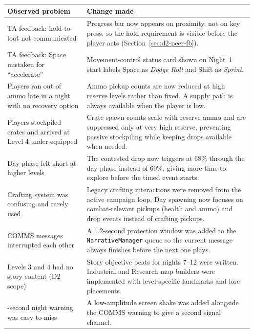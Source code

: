 \documentclass[11pt,a4paper]{article}
\begin{document}
\begin{tcolorbox}[tableframe]
\small
\begin{tabularx}{\textwidth}{@{} p{3.5cm} X @{}}
\toprule
\textbf{Observed problem} & \textbf{Change made} \\
\midrule
TA feedback: hold-to-loot not communicated & Progress bar now appears on proximity, not on key press, so the hold requirement is visible before the player acts (Section~\ref{sec:d2-peer-fb}). \\
\addlinespace
TA feedback: Space mistaken for ``accelerate'' & Movement-control status card shown on Night~1 start labels Space as \textit{Dodge Roll} and Shift as \textit{Sprint}. \\
\addlinespace
Players ran out of ammo late in a night with no recovery option & Ammo pickup counts are now reduced at high reserve levels rather than fixed. A supply path is always available when the player is low. \\
\addlinespace
Players stockpiled crates and arrived at Level 4 under-equipped & Crate spawn counts scale with reserve ammo and are suppressed only at very high reserve, preventing passive stockpiling while keeping drops available when needed. \\
\addlinespace
Day phase felt short at higher levels & The contested drop now triggers at 68\% through the day phase instead of 60\%, giving more time to explore before the timed event starts. \\
\addlinespace
Crafting system was confusing and rarely used & Legacy crafting interactions were removed from the active campaign loop. Day spawning now focuses on combat-relevant pickups (health and ammo) and drop events instead of crafting pickups. \\
\addlinespace
COMMS messages interrupted each other & A 1.2-second protection window was added to the \texttt{NarrativeManager} queue so the current message always finishes before the next one plays. \\
\addlinespace
Levels 3 and 4 had no story content (D2 scope) & Story objective beats for nights 7--12 were written. Industrial and Research map builders were implemented with level-specific landmarks and lore placements. \\
\addlinespace
15-second night warning was easy to miss & A low-amplitude screen shake was added alongside the COMMS warning to give a second signal channel. \\
\bottomrule
\end{tabularx}
\end{tcolorbox}
\end{document}
